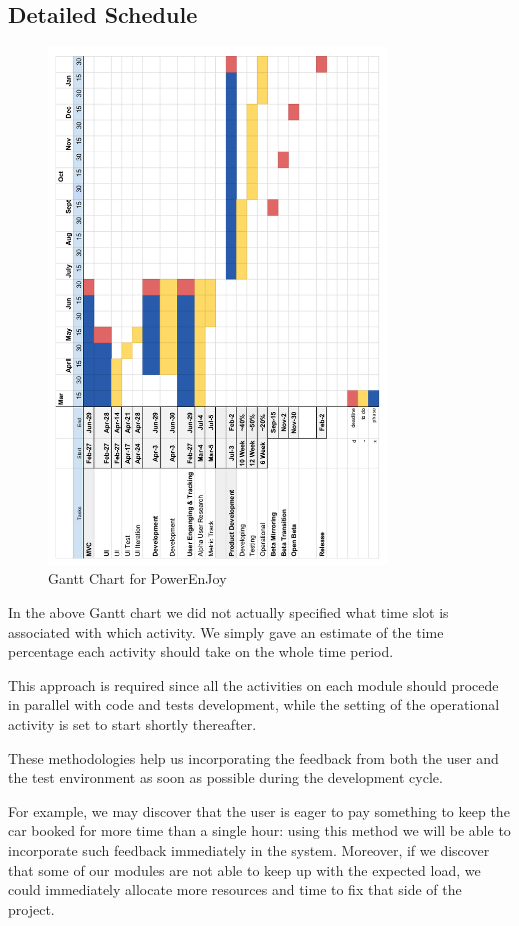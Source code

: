 \documentclass[11pt]{article} %
\newcommand{\pe}{PowerEnJoy }
\begin{document}
\subsection{Detailed Schedule}
\begin{figure}[H]
	\centering
	\includegraphics[width=0.8\textwidth]{GANTT/GANTT.png}
	\caption{Gantt Chart for \pe}
\end{figure}	

In the above Gantt chart we did not actually specified what time slot is associated with which activity. We simply gave an estimate of the time percentage each activity should take on the whole time period.

This approach is required since all the activities on each module should procede in parallel with code and tests development, while the setting of the operational activity is set to start shortly thereafter.

These methodologies help us incorporating the feedback from both the user and the test environment as soon as possible during the development cycle. 

For example, we may discover that the user is eager to pay something to keep the car booked for more time than a single hour: using this method we will be able to incorporate such feedback immediately in the system.
Moreover, if we discover that some of our modules are not able to keep up with the expected load, we could immediately allocate more resources and time to fix that side of the project.
\end{document}
